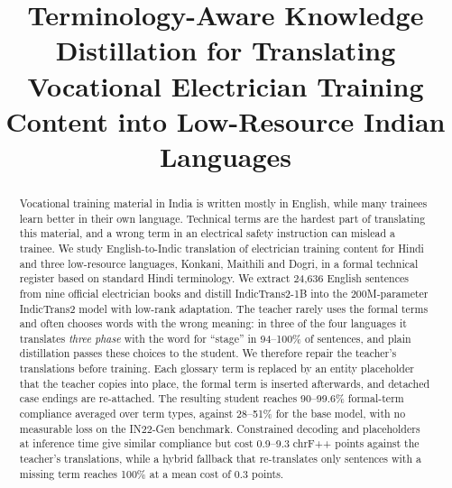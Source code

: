 \documentclass[conference]{IEEEtran}
\begin{document}
\title{Terminology-Aware Knowledge Distillation for Translating Vocational Electrician Training Content into Low-Resource Indian Languages}

\author{
\and
{}
\and
{}
}

\maketitle

\begin{abstract}
Vocational training material in India is written mostly in English, while many trainees learn better in their own language. Technical terms are the hardest part of translating this material, and a wrong term in an electrical safety instruction can mislead a trainee. We study English-to-Indic translation of electrician training content for Hindi and three low-resource languages, Konkani, Maithili and Dogri, in a formal technical register based on standard Hindi terminology. We extract 24,636 English sentences from nine official electrician books and distill IndicTrans2-1B into the 200M-parameter IndicTrans2 model with low-rank adaptation. The teacher rarely uses the formal terms and often chooses words with the wrong meaning: in three of the four languages it translates \emph{three phase} with the word for ``stage'' in 94--100\% of sentences, and plain distillation passes these choices to the student. We therefore repair the teacher's translations before training. Each glossary term is replaced by an entity placeholder that the teacher copies into place, the formal term is inserted afterwards, and detached case endings are re-attached. The resulting student reaches 90--99.6\% formal-term compliance averaged over term types, against 28--51\% for the base model, with no measurable loss on the IN22-Gen benchmark. Constrained decoding and placeholders at inference time give similar compliance but cost 0.9--9.3 chrF++ points against the teacher's translations, while a hybrid fallback that re-translates only sentences with a missing term reaches 100\% at a mean cost of 0.3 points.
\end{abstract}
\end{document}
